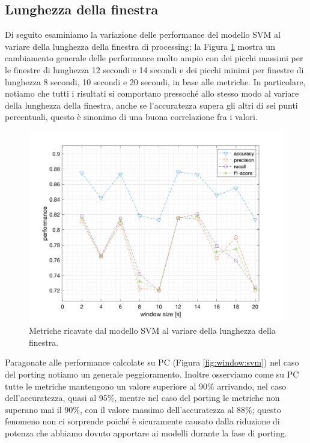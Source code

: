 \subsection{Lunghezza della finestra}
\label{ssec:lunghezza-della-finestra-hexi}

Di seguito esaminiamo la variazione delle performance del modello SVM al variare della lunghezza della finestra di processing; la Figura \ref{fig:metrics-svm-window-hexi} mostra un cambiamento generale delle performance molto ampio con dei picchi massimi per le finestre di lunghezza 12 secondi e 14 secondi e dei picchi minimi per finestre di lunghezza 8 secondi, 10 secondi e 20 secondi, in base alle metriche. In particolare, notiamo che tutti i risultati si comportano pressoché allo stesso modo al variare della lunghezza della finestra, anche se l'accuratezza supera gli altri di sei punti percentuali, questo è sinonimo di una buona correlazione fra i valori.

\begin{figure}[!htb]
    \centering
    \includegraphics[width=.8\textwidth]{figure/svm_performance.png}
    \caption{Metriche ricavate dal modello SVM al variare della lunghezza della finestra.}
    \label{fig:metrics-svm-window-hexi}
\end{figure}

Paragonate alle performance calcolate su PC (Figura \ref{fig:window:svm}) nel caso del porting notiamo un generale peggioramento. Inoltre osserviamo come su PC tutte le metriche mantengono un valore superiore al 90\% arrivando, nel caso dell'accuratezza, quasi al 95\%, mentre nel caso del porting le metriche non superano mai il 90\%, con il valore massimo dell'accuratezza al 88\%; questo fenomeno non ci sorprende poiché è sicuramente causato dalla riduzione di potenza che abbiamo dovuto apportare ai modelli durante la fase di porting.

